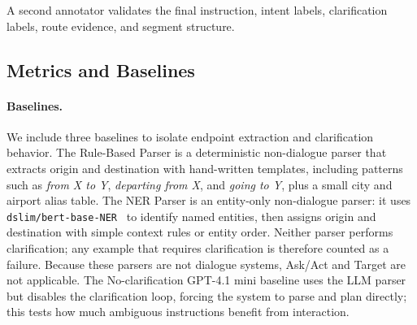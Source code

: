 \documentclass[11pt]{article}
\begin{document}
A second annotator validates the final instruction, intent labels, clarification labels, route evidence, and segment structure.

\subsection{Metrics and Baselines}


\paragraph{Baselines.}
We include three baselines to isolate endpoint extraction and clarification behavior. The Rule-Based Parser is a deterministic non-dialogue parser that extracts origin and destination with hand-written templates, including patterns such as \textit{from X to Y}, \textit{departing from X}, and \textit{going to Y}, plus a small city and airport alias table. The NER Parser is an entity-only non-dialogue parser: it uses \texttt{dslim/bert-base-NER}~\citep{devlin-etal-2019-bert,huggingface_dslim_bert_ner_2026} to identify named entities, then assigns origin and destination with simple context rules or entity order. Neither parser performs clarification; any example that requires clarification is therefore counted as a failure. Because these parsers are not dialogue systems, Ask/Act and Target are not applicable. The No-clarification GPT-4.1 mini baseline uses the LLM parser but disables the clarification loop, forcing the system to parse and plan directly; this tests how much ambiguous instructions benefit from interaction.
\end{document}
